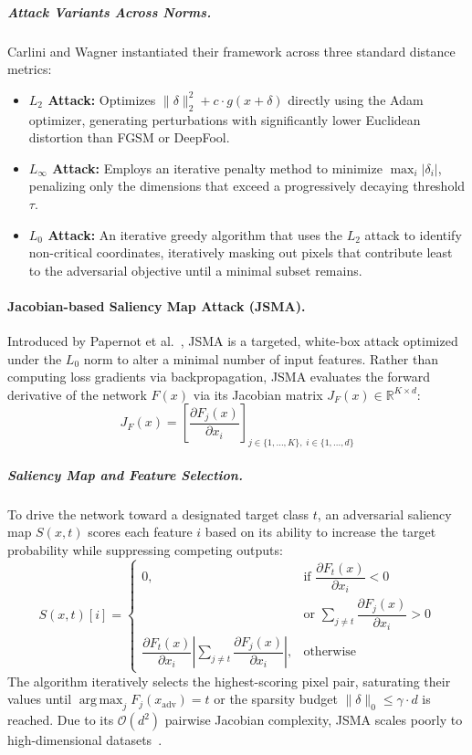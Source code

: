 \documentclass[12pt]{article}
\DeclareMathOperator*{\argmax}{arg\,max}
\begin{document}
\subparagraph{Attack Variants Across Norms.} Carlini and Wagner instantiated their framework across three standard distance metrics:
\begin{itemize}
  \item \textbf{$L_2$ Attack:} Optimizes $\lVert \delta \rVert_2^{2} + c \cdot g(x+\delta)$ directly using the Adam optimizer, generating perturbations with significantly lower Euclidean distortion than FGSM or DeepFool.
  \item \textbf{$L_\infty$ Attack:} Employs an iterative penalty method to minimize $\max_i \lvert \delta_i \rvert$, penalizing only the dimensions that exceed a progressively decaying threshold $\tau$.
  \item \textbf{$L_0$ Attack:} An iterative greedy algorithm that uses the $L_2$ attack to identify non-critical coordinates, iteratively masking out pixels that contribute least to the adversarial objective until a minimal subset remains.
\end{itemize}

\paragraph{Jacobian-based Saliency Map Attack (JSMA).} Introduced by Papernot et al.~\cite{papernot2016limitations}, JSMA is a targeted, white-box attack optimized under the $L_0$ norm to alter a minimal number of input features. Rather than computing loss gradients via backpropagation, JSMA evaluates the forward derivative of the network $F(x)$ via its Jacobian matrix $J_F(x) \in \mathbb{R}^{K \times d}$:
\begin{equation}
  J_F(x) = \left[ \frac{\partial F_j(x)}{\partial x_i} \right]_{j \in \{1,\dots,K\},\; i \in \{1,\dots,d\}}
\end{equation}

\subparagraph{Saliency Map and Feature Selection.} To drive the network toward a designated target class $t$, an adversarial saliency map $S(x, t)$ scores each feature $i$ based on its ability to increase the target probability while suppressing competing outputs:
\begin{equation}
  S(x, t)[i] =
  \begin{cases}
    0, & \text{if } \dfrac{\partial F_t(x)}{\partial x_i} < 0 \\[1.5ex]
       & \text{or } \displaystyle\sum_{j \neq t} \dfrac{\partial F_j(x)}{\partial x_i} > 0 \\[1.5ex]
    \dfrac{\partial F_t(x)}{\partial x_i} \left\lvert \displaystyle\sum_{j \neq t} \dfrac{\partial F_j(x)}{\partial x_i} \right\rvert, & \text{otherwise}
  \end{cases}
\end{equation}
The algorithm iteratively selects the highest-scoring pixel pair, saturating their values until $\argmax_j F_j(x_{\mathrm{adv}}) = t$ or the sparsity budget $\lVert\delta\rVert_0 \le \gamma \cdot d$ is reached. Due to its $\mathcal{O}(d^2)$ pairwise Jacobian complexity, JSMA scales poorly to high-dimensional datasets~\cite{papernot2018sok,papernot2016limitations}.
\end{document}
